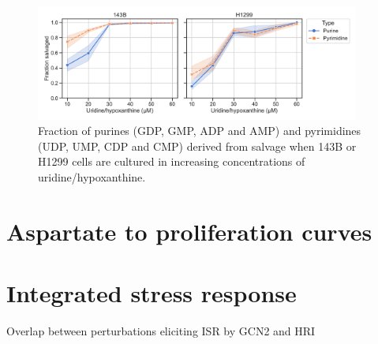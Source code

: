 \begin{figure}
    \centering
    \includegraphics[width=0.95\textwidth]{figures/chap2/sal_frac_conc.pdf}
    \caption[Salvage as a function of Urd/Hpx concentration]{
    Fraction of purines (GDP, GMP, ADP and AMP) and pyrimidines (UDP, UMP, CDP and CMP) derived from salvage when 143B or H1299 cells are cultured in increasing concentrations of uridine/hypoxanthine.
    }
    \label{fig:ch2:sal_frac_conc}
\end{figure}







\section{Aspartate to proliferation curves}






\section{Integrated stress response}

Overlap between perturbations eliciting ISR by GCN2 and HRI \cite{Taniuchi2016-nc}



